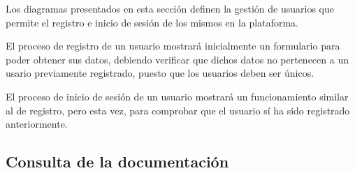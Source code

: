             Los diagramas presentados en esta sección definen la gestión de usuarios que permite el registro e inicio de sesión de los mismos en la plataforma.
            
            El proceso de registro de un usuario mostrará inicialmente un formulario para poder obtener sus datos, debiendo verificar que dichos datos no pertenecen a un usario previamente registrado, puesto que los usuarios deben ser únicos.
            
            El proceso de inicio de sesión de un usuario mostrará un funcionamiento similar al de registro, pero esta vez, para comprobar que el usuario sí ha sido registrado anteriormente.
            
            \newpage
            
            
        \subsection{Consulta de la documentación}
            \label{sec:consulta-documentacion}
            
